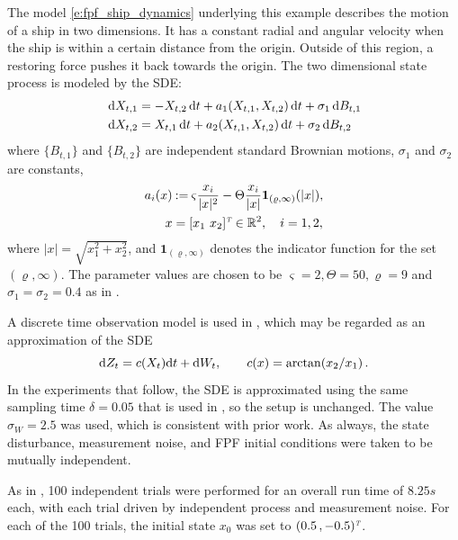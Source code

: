 The model  \eqref{e:fpf_ship_dynamics}
underlying this example  describes the motion of a ship in two dimensions.  It has
a constant radial and angular velocity when the ship is within a certain distance from the origin.  Outside of this region, a
restoring force pushes it back towards the origin. The two dimensional state process is modeled by the SDE:
\begin{equation}
\begin{aligned}
\rmd X_{t,1} & = - X_{t,2} \rmd t + a_1(X_{t,1}, X_{t,2}) \rmd t + \sigma_1 \rmd B_{t ,1}\\
\rmd X_{t,2} & = X_{t,1} \rmd t + a_2(X_{t,1}, X_{t,2}) \rmd t + \sigma_2 \rmd B_{t,2}
\label{e:fpf_ship_dynamics}
\end{aligned}
\end{equation}
where $\{B_{t,1}\}$ and $\{B_{t,2}\}$ are independent standard Brownian motions, $\sigma_1$ and $\sigma_2$ are constants,
\[
\begin{aligned}
a_i(x) & \mathbin{:=} \varsigma \frac{x_i}{|x|^2} - \Theta \frac{x_i}{|x|}\mathbf{1}_{(\varrho,\infty)}(|x|),\\
x & = [x_1\,\, x_2]^{\hbox{\tiny\it T}} \in \mathbb{R}^2, \quad i=1,2,
\end{aligned}
\]
where $|x| = \sqrt{x_1^2 + x_2^2}$, and
$\mathbf{1}_{(\varrho,\infty)}$ denotes the indicator function for the set $(\varrho, \infty)$. The parameter values are chosen to be $\varsigma = 2, \Theta  = 50, \varrho = 9$ and $\sigma_1=\sigma_2=0.4$ as in \cite{budchelee07,tilghiomeh13}.

A discrete time observation model is used in \cite{budchelee07}, which may be regarded as an approximation of the
SDE
\[
\text{d} Z_t = c(X_t)\text{d} t + \text{d} W_t,\qquad   c(x) = \arctan(x_2/x_1)\, .
\]
In the experiments that follow, the SDE is approximated using the same sampling time $\delta =0.05$ that is used in  \cite{budchelee07}, so the setup is unchanged.   The value $\sigma_W =2.5$ was used, which is consistent with prior work.
As always, the state disturbance, measurement noise,  and FPF initial conditions were taken to be mutually independent.


As in \cite{budchelee07,tilghiomeh13}, 100 independent trials were performed for an overall run time of $8.25s$ each,
with each trial driven by independent process and measurement noise. For each of the 100 trials, the initial state $x_0$ was set to $(0.5 \, , -0.5)^{\hbox{\tiny\it T}}$.


